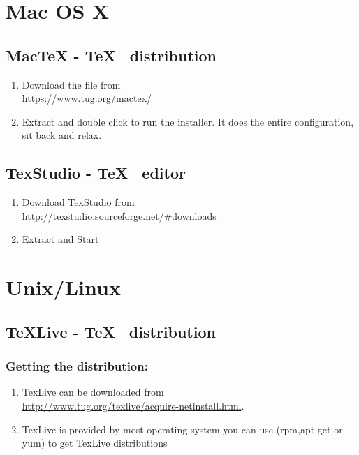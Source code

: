 \section*{Mac OS X}
\subsection*{MacTeX - \TeX~ distribution}
\begin{enumerate}
\item	Download the file from\\
\href{https://www.tug.org/mactex/}{https://www.tug.org/mactex/}
\item	Extract and double click to run the installer. It does the entire configuration, sit back and relax.
\end{enumerate}

\subsection*{TexStudio - \TeX~ editor}
\begin{enumerate}
\item	Download TexStudio from\\
\href{http://texstudio.sourceforge.net/\#downloads}
{http://texstudio.sourceforge.net/\#downloads} 
\item	Extract and Start
\end{enumerate}


\section*{Unix/Linux}
\subsection*{TeXLive - \TeX~ distribution}
\subsubsection*{Getting the distribution:}
\begin{enumerate}
\item	TexLive can be downloaded from\\
\href{http://www.tug.org/texlive/acquire-netinstall.html}
{http://www.tug.org/texlive/acquire-netinstall.html}.
\item	TexLive is provided by most operating system you can use (rpm,apt-get or yum) to get TexLive distributions
\end{enumerate}


